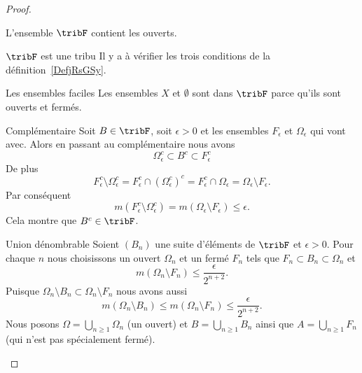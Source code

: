 \begin{proof}
\begin{subproof}
            L'ensemble \( \tribF\) contient les ouverts.

        \item[\( \tribF\) est une tribu]
            Il y a à vérifier les trois conditions de la définition~\ref{DefjRsGSy}.
            \begin{subproof}
            \item[Les ensembles faciles]
                Les ensembles \( X\) et \( \emptyset\) sont dans \( \tribF\) parce qu'ils sont ouverts et fermés.
            \item[Complémentaire]
                Soit \( B\in \tribF\), soit \( \epsilon>0\) et les ensembles \( F_{\epsilon} \) et \( \Omega_{\epsilon}\) qui vont avec. Alors en passant au complémentaire nous avons
                \begin{equation}
                    \Omega_{\epsilon}^c\subset B^c\subset F_{\epsilon}^c
                \end{equation}
                De plus
                \begin{equation}
                    F_{\epsilon}^c\setminus \Omega_{\epsilon}^c=F_{\epsilon}^c\cap(\Omega_{\epsilon}^c)^c=F_{\epsilon}^c\cap \Omega_{\epsilon}=\Omega_{\epsilon}\setminus F_{\epsilon}.
                \end{equation}
                Par conséquent
                \begin{equation}
                    m(F_{\epsilon}^c\setminus \Omega_{\epsilon}^c)=m(\Omega_{\epsilon}\setminus F_{\epsilon})\leq \epsilon.
                \end{equation}
                Cela montre que \( B^c\in \tribF\).
            \item[Union dénombrable]
                Soient \( (B_n)\) une suite d'éléments de \( \tribF\) et \( \epsilon>0\). Pour chaque \( n\) nous choisissons un ouvert \( \Omega_n\) et un fermé \( F_n\) tels que \( F_n\subset  B_n\subset \Omega_n\) et
                \begin{equation}
                    m(\Omega_n\setminus F_n)\leq \frac{ \epsilon }{ 2^{n+2} }.
                \end{equation}
                Puisque \( \Omega_n\setminus B_n\subset \Omega_n\setminus F_n\) nous avons aussi
                \begin{equation}
                    m(\Omega_n\setminus B_n)\leq m(\Omega_n\setminus F_n)\leq \frac{ \epsilon }{ 2^{n+2} }.
                \end{equation}
                Nous posons \( \Omega=\bigcup_{n\geq 1}\Omega_n\) (un ouvert) et \( B=\bigcup_{n\geq 1}B_n\) ainsi que \( A=\bigcup_{n\geq 1}F_n\) (qui n'est pas spécialement fermé).


\end{subproof}
\end{subproof}
\end{proof}
